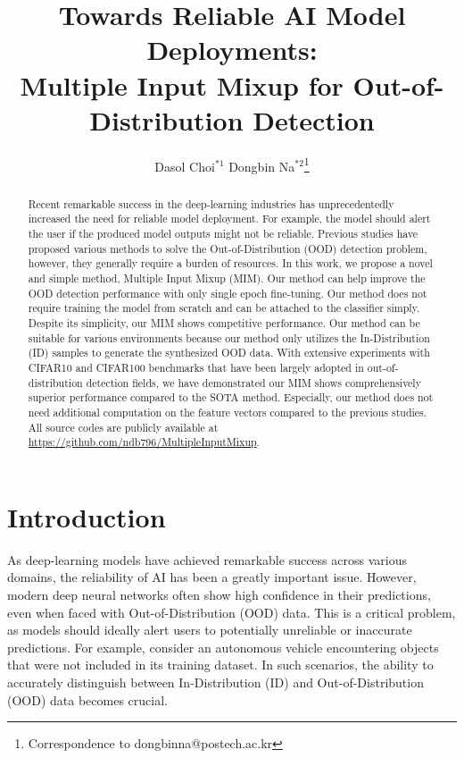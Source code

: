 \documentclass[letterpaper]{article} %
\title{Towards Reliable AI Model Deployments:\\Multiple Input Mixup for Out-of-Distribution Detection}
\author {
    Dasol Choi$^{*1}$ \;
    \stepcounter{footnote}Dongbin Na$^{*2}$\thanks{Correspondence to dongbinna@postech.ac.kr}
}
\begin{document}
\maketitle
\def\thefootnote{*}
\vspace{-0.1cm}
\begin{abstract}
\vspace{-0.2cm}
Recent remarkable success in the deep-learning industries has unprecedentedly increased the need for reliable model deployment.
For example, the model should alert the user if the produced model outputs might not be reliable.
Previous studies have proposed various methods to solve the Out-of-Distribution (OOD) detection problem, however, they generally require a burden of resources.
In this work, we propose a novel and simple method, Multiple Input Mixup (MIM).
Our method can help improve the OOD detection performance with only single epoch fine-tuning.
Our method does not require training the model from scratch and can be attached to the classifier simply.
Despite its simplicity, our MIM shows competitive performance.
Our method can be suitable for various environments because our method only utilizes the In-Distribution (ID) samples to generate the synthesized OOD data.
With extensive experiments with CIFAR10 and CIFAR100 benchmarks that have been largely adopted in out-of-distribution detection fields, we have demonstrated our MIM shows comprehensively superior performance compared to the SOTA method.
Especially, our method does not need additional computation on the feature vectors compared to the previous studies.
All source codes are publicly available at \textcolor{blue}{\url{https://github.com/ndb796/MultipleInputMixup}}.
\vspace{-0.2cm}
\end{abstract}
\section{Introduction}
\vspace{-0.1cm}
As deep-learning models have achieved remarkable success across various domains, the reliability of AI has been a greatly important issue.
However, modern deep neural networks often show high confidence in their predictions, even when faced with Out-of-Distribution (OOD) data.
This is a critical problem, as models should ideally alert users to potentially unreliable or inaccurate predictions.
For example, consider an autonomous vehicle encountering objects that were not included in its training dataset. In such scenarios, the ability to accurately distinguish between In-Distribution (ID) and Out-of-Distribution (OOD) data becomes crucial.
\end{document}
